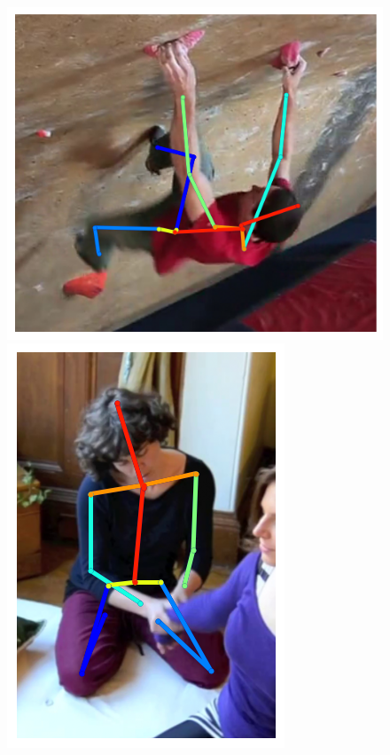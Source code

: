 \begin{figure}[t!]
    \hfill
    \includegraphics[height=\flowh]{resources/Human_Poses/pose/qualitative/pred-10}
    \hfill
    \includegraphics[height=\flowh]{resources/Human_Poses/pose/qualitative/pred-11}
    \hfill

\end{figure}
